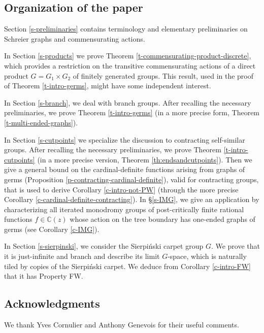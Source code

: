 \documentclass[11pt]{amsart}
\theoremstyle{definition}
\theoremstyle{plain}
\newtheorem{main thm}{Theorem}
\theoremstyle{remark}
\theoremstyle{plain}
\begin{document}
\subsection*{Organization of the paper}
Section \ref{s-preliminaries} contains terminology and elementary preliminaries on Schreier graphs and  commensurating actions.

In Section \ref{s-products} we prove Theorem \ref{t-commensurating-product-discrete}, which provides a restriction on the transitive commensurating actions of a direct product $G=G_1\times G_2$ of finitely generated groups. This result, used in the proof of Theorem \ref{t-intro-germs}, might have some independent interest. 

In Section \ref{s-branch}, we deal with branch groups. After recalling the necessary preliminaries, we prove Theorem \ref{t-intro-germs} (in a more precise form, Theorem \ref{t-multi-ended-graphs}).

In Section \ref{s-cutpoints} we specialize the discussion to contracting self-similar groups. After recalling the necessary preliminaries, we prove Theorem \ref{t-intro-cutpoints} (in a more precise version, Theorem \ref{th:endsandcutpoints}). Then we give a general bound on the cardinal-definite functions arising from graphs of germs (Proposition \ref{p-contracting-cardinal-definite}), valid for contracting groups, that is used to derive Corollary \ref{c-intro-not-PW} (through the more precise Corollary \ref{c-cardinal-definite-contracting}).  In \S\ref{s-IMG}, we give an application by characterizing all iterated monodromy groups of post-critically finite rational functions $f\in \mathbb{C}(z)$ whose action on the tree boundary has one-ended graphs of germs (see Corollary \ref{c-IMG}). 

In Section \ref{s-sierpinski}, we consider the Sierpi\'nski carpet group $G$. We prove that it is just-infinite and branch and describe its limit $G$-space, which is naturally tiled by copies of the Sierpi\'nski carpet. We deduce from Corollary \ref{c-intro-FW} that it has Property FW. 




\subsection*{Acknowledgments} We thank Yves Cornulier and Anthony Genevois for their useful comments.
\end{document}
